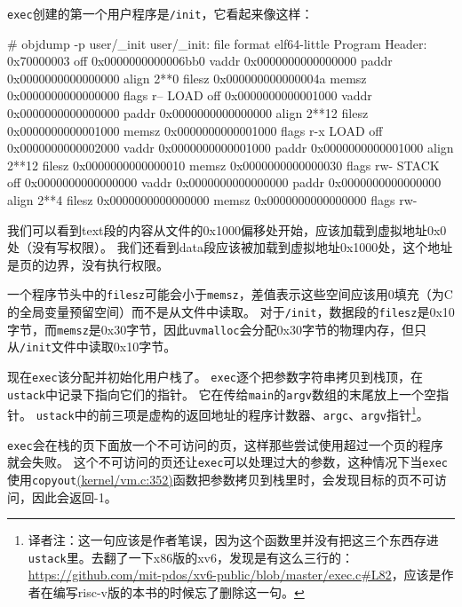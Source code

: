\texttt{exec}创建的第一个用户程序是\texttt{/init}，它看起来像这样：
\begin{blacklisting}
    # objdump -p user/_init
    user/_init:     file format elf64-little
    Program Header:
    0x70000003 off    0x0000000000006bb0 vaddr 0x0000000000000000
                                           paddr 0x0000000000000000 align 2**0
             filesz 0x000000000000004a memsz 0x0000000000000000 flags r--
        LOAD off    0x0000000000001000 vaddr 0x0000000000000000
                                           paddr 0x0000000000000000 align 2**12
             filesz 0x0000000000001000 memsz 0x0000000000001000 flags r-x
        LOAD off    0x0000000000002000 vaddr 0x0000000000001000
                                           paddr 0x0000000000001000 align 2**12
             filesz 0x0000000000000010 memsz 0x0000000000000030 flags rw-
       STACK off    0x0000000000000000 vaddr 0x0000000000000000
                                           paddr 0x0000000000000000 align 2**4
             filesz 0x0000000000000000 memsz 0x0000000000000000 flags rw-
\end{blacklisting}

我们可以看到text段的内容从文件的0x1000偏移处开始，应该加载到虚拟地址0x0处（没有写权限）。
我们还看到data段应该被加载到虚拟地址0x1000处，这个地址是页的边界，没有执行权限。

一个程序节头中的\texttt{filesz}可能会小于\texttt{memsz}，差值表示这些空间应该用0填充（为C的全局变量预留空间）而不是从文件中读取。
对于\texttt{/init}，数据段的\texttt{filesz}是0x10字节，而\texttt{memsz}是0x30字节，因此\texttt{uvmalloc}会分配0x30字节的物理内存，但只从\texttt{/init}文件中读取0x10字节。

现在\texttt{exec}该分配并初始化用户栈了。
\texttt{exec}逐个把参数字符串拷贝到栈顶，在\texttt{ustack}中记录下指向它们的指针。
它在传给\texttt{main}的\texttt{argv}数组的末尾放上一个空指针。
\texttt{ustack}中的前三项是虚构的返回地址的程序计数器、\texttt{argc}、\texttt{argv}指针\footnote{译者注：这一句应该是作者笔误，因为这个函数里并没有把这三个东西存进\texttt{ustack}里。去翻了一下x86版的xv6，发现是有这么三行的：\url{https://github.com/mit-pdos/xv6-public/blob/master/exec.c\#L82}，应该是作者在编写risc-v版的本书的时候忘了删除这一句。}。

\texttt{exec}会在栈的页下面放一个不可访问的页，这样那些尝试使用超过一个页的程序就会失败。
这个不可访问的页还让\texttt{exec}可以处理过大的参数，这种情况下当\texttt{exec}使用\texttt{copyout}\href{https://github.com/mit-pdos/xv6-riscv/blob/riscv/kernel/vm.c#L352}{(kernel/vm.c:352)}函数把参数拷贝到栈里时，会发现目标的页不可访问，因此会返回-1。

